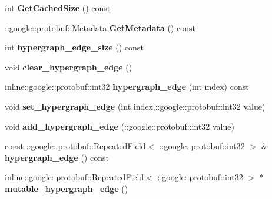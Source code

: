 \begin{DoxyCompactItemize}
\item 
\hypertarget{classlattice_1_1Origin_a1b84d6bcbe33ca6aa15fc0659fe1ce6c}{
int {\bfseries GetCachedSize} () const }
\label{classlattice_1_1Origin_a1b84d6bcbe33ca6aa15fc0659fe1ce6c}

\item 
\hypertarget{classlattice_1_1Origin_a0f268f800e3755611e74c67e0e81fa73}{
::google::protobuf::Metadata {\bfseries GetMetadata} () const }
\label{classlattice_1_1Origin_a0f268f800e3755611e74c67e0e81fa73}

\item 
\hypertarget{classlattice_1_1Origin_a5a7105c401b9faf2975a62ad0f6e5f9c}{
int {\bfseries hypergraph\_\-edge\_\-size} () const }
\label{classlattice_1_1Origin_a5a7105c401b9faf2975a62ad0f6e5f9c}

\item 
\hypertarget{classlattice_1_1Origin_a16018cbe1e1bda37da1faeda9c113654}{
void {\bfseries clear\_\-hypergraph\_\-edge} ()}
\label{classlattice_1_1Origin_a16018cbe1e1bda37da1faeda9c113654}

\item 
\hypertarget{classlattice_1_1Origin_a5a0033d07d792ad0da3388746bc50dd0}{
inline::google::protobuf::int32 {\bfseries hypergraph\_\-edge} (int index) const }
\label{classlattice_1_1Origin_a5a0033d07d792ad0da3388746bc50dd0}

\item 
\hypertarget{classlattice_1_1Origin_a4ae3e1c5181c4224f9569c7ef916aa94}{
void {\bfseries set\_\-hypergraph\_\-edge} (int index,::google::protobuf::int32 value)}
\label{classlattice_1_1Origin_a4ae3e1c5181c4224f9569c7ef916aa94}

\item 
\hypertarget{classlattice_1_1Origin_adb776f18649e3baa7df68d53dc79bbd6}{
void {\bfseries add\_\-hypergraph\_\-edge} (::google::protobuf::int32 value)}
\label{classlattice_1_1Origin_adb776f18649e3baa7df68d53dc79bbd6}

\item 
\hypertarget{classlattice_1_1Origin_a86672ab29cc9b2b85da694917dd38f2a}{
const ::google::protobuf::RepeatedField$<$ ::google::protobuf::int32 $>$ \& {\bfseries hypergraph\_\-edge} () const }
\label{classlattice_1_1Origin_a86672ab29cc9b2b85da694917dd38f2a}

\item 
\hypertarget{classlattice_1_1Origin_ab9fd75828ae2c7b5188beba8e7d511a5}{
inline::google::protobuf::RepeatedField$<$ ::google::protobuf::int32 $>$ $\ast$ {\bfseries mutable\_\-hypergraph\_\-edge} ()}
\label{classlattice_1_1Origin_ab9fd75828ae2c7b5188beba8e7d511a5}


\end{DoxyCompactItemize}
